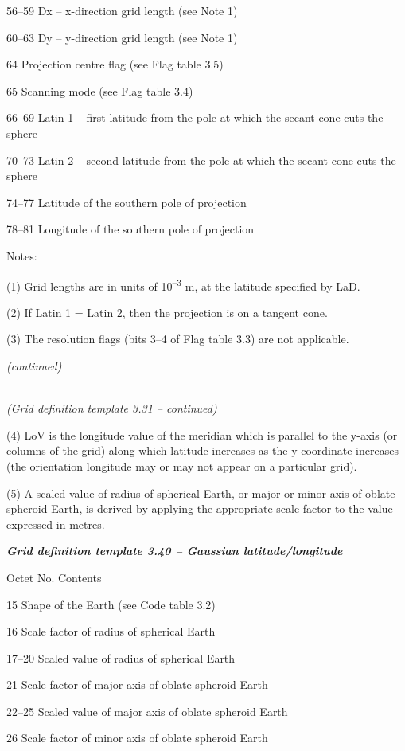 56--59 Dx -- x-direction grid length (see Note 1)

60--63 Dy -- y-direction grid length (see Note 1)

64 Projection centre flag (see Flag table 3.5)

65 Scanning mode (see Flag table 3.4)

66--69 Latin 1 -- first latitude from the pole at which the secant cone cuts the sphere

70--73 Latin 2 -- second latitude from the pole at which the secant cone cuts the sphere

74--77 Latitude of the southern pole of projection

78--81 Longitude of the southern pole of projection

Notes:

(1) Grid lengths are in units of 10\textsuperscript{--3} m, at the latitude specified by LaD.

(2) If Latin 1 = Latin 2, then the projection is on a tangent cone.

(3) The resolution flags (bits 3--4 of Flag table 3.3) are not applicable.

\emph{(continued)}

\emph{\\
(Grid definition template 3.31 -- continued)}

(4) LoV is the longitude value of the meridian which is parallel to the y-axis (or columns of the grid) along which latitude increases as the y-coordinate increases (the orientation longitude may or may not appear on a particular grid).

(5) A scaled value of radius of spherical Earth, or major or minor axis of oblate spheroid Earth, is derived by applying the appropriate scale factor to the value expressed in metres.

\emph{\textbf{Grid definition template 3.40 -- Gaussian latitude/longitude}}

Octet No. Contents

15 Shape of the Earth (see Code table 3.2)

16 Scale factor of radius of spherical Earth

17--20 Scaled value of radius of spherical Earth

21 Scale factor of major axis of oblate spheroid Earth

22--25 Scaled value of major axis of oblate spheroid Earth

26 Scale factor of minor axis of oblate spheroid Earth

